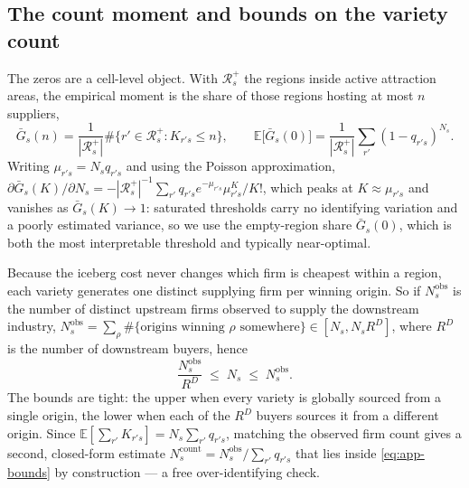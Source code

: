 \subsection{The count moment and bounds on the variety count}
\label{app:model-bounds}

The zeros are a cell-level object. With $\mathcal{R}^{+}_{s}$ the regions inside active
attraction areas, the empirical moment is the share of those regions hosting at most $n$
suppliers,
\begin{equation}
\bar G_{s}(n)=\frac{1}{|\mathcal{R}^{+}_{s}|}
\#\big\{r'\in\mathcal{R}^{+}_{s}:K_{r's}\le n\big\},
\qquad
\mathbb{E}\big[\bar G_{s}(0)\big]=\frac{1}{|\mathcal{R}^{+}_{s}|}\sum_{r'}(1-q_{r's})^{N_{s}} .
\label{eq:app-count}
\end{equation}
Writing $\mu_{r's}=N_{s}q_{r's}$ and using the Poisson approximation,
$\partial\bar G_{s}(K)/\partial N_{s}
=-|\mathcal{R}^{+}_{s}|^{-1}\sum_{r'}q_{r's}e^{-\mu_{r's}}\mu_{r's}^{K}/K!$, which peaks at
$K\approx\mu_{r's}$ and vanishes as $\bar G_{s}(K)\to1$: saturated thresholds carry no
identifying variation and a poorly estimated variance, so we use the empty-region share
$\bar G_{s}(0)$, which is both the most interpretable threshold and typically near-optimal.

Because the iceberg cost never changes which firm is cheapest within a region, each variety
generates one distinct supplying firm per winning origin. So if $N^{\mathrm{obs}}_{s}$ is the
number of distinct upstream firms observed to supply the downstream industry,
$N^{\mathrm{obs}}_{s}=\sum_{\rho}\#\{\text{origins winning }\rho\text{ somewhere}\}\in[N_{s},N_{s}R^{D}]$,
where $R^{D}$ is the number of downstream buyers, hence
\begin{equation}
\frac{N^{\mathrm{obs}}_{s}}{R^{D}}\;\le\;N_{s}\;\le\;N^{\mathrm{obs}}_{s} .
\label{eq:app-bounds}
\end{equation}
The bounds are tight: the upper when every variety is globally sourced from a single origin, the
lower when each of the $R^{D}$ buyers sources it from a different origin. Since
$\mathbb{E}[\sum_{r'}K_{r's}]=N_{s}\sum_{r'}q_{r's}$, matching the observed firm count gives a second,
closed-form estimate $N^{\mathrm{count}}_{s}=N^{\mathrm{obs}}_{s}/\sum_{r'}q_{r's}$ that lies
inside \eqref{eq:app-bounds} by construction --- a free over-identifying check.

